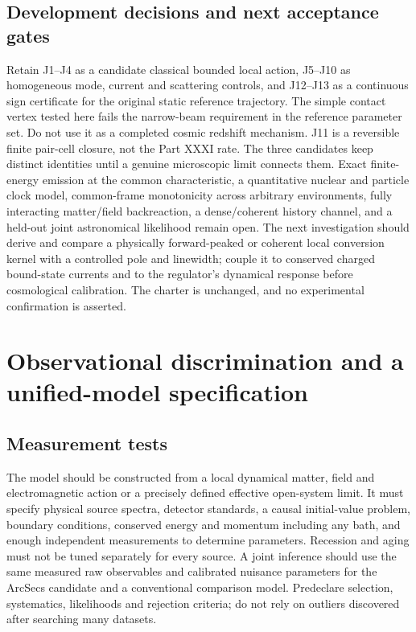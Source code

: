 \documentclass[
  11pt,
  twoside]{article}
\begin{document}
\subsection{Development decisions and next acceptance
gates}\label{development-decisions-and-next-acceptance-gates}

Retain J1--J4 as a candidate classical bounded local action, J5--J10 as
homogeneous mode, current and scattering controls, and J12--J13 as a
continuous sign certificate for the original static reference
trajectory. The simple contact vertex tested here fails the narrow-beam
requirement in the reference parameter set. Do not use it as a completed
cosmic redshift mechanism. J11 is a reversible finite pair-cell closure,
not the Part XXXI rate. The three candidates keep distinct identities
until a genuine microscopic limit connects them. Exact finite-energy
emission at the common characteristic, a quantitative nuclear and
particle clock model, common-frame monotonicity across arbitrary
environments, fully interacting matter/field backreaction, a
dense/coherent history channel, and a held-out joint astronomical
likelihood remain open. The next investigation should derive and compare
a physically forward-peaked or coherent local conversion kernel with a
controlled pole and linewidth; couple it to conserved charged
bound-state currents and to the regulator's dynamical response before
cosmological calibration. The charter is unchanged, and no experimental
confirmation is asserted.

\section{Observational discrimination and a unified-model
specification}\label{observational-discrimination-and-a-unified-model-specification}

\subsection{Measurement tests}\label{measurement-tests}

The model should be constructed from a local dynamical matter, field and
electromagnetic action or a precisely defined effective open-system
limit. It must specify physical source spectra, detector standards, a
causal initial-value problem, boundary conditions, conserved energy and
momentum including any bath, and enough independent measurements to
determine parameters. Recession and aging must not be tuned separately
for every source. A joint inference should use the same measured raw
observables and calibrated nuisance parameters for the ArcSecs candidate
and a conventional comparison model. Predeclare selection, systematics,
likelihoods and rejection criteria; do not rely on outliers discovered
after searching many datasets.
\end{document}
